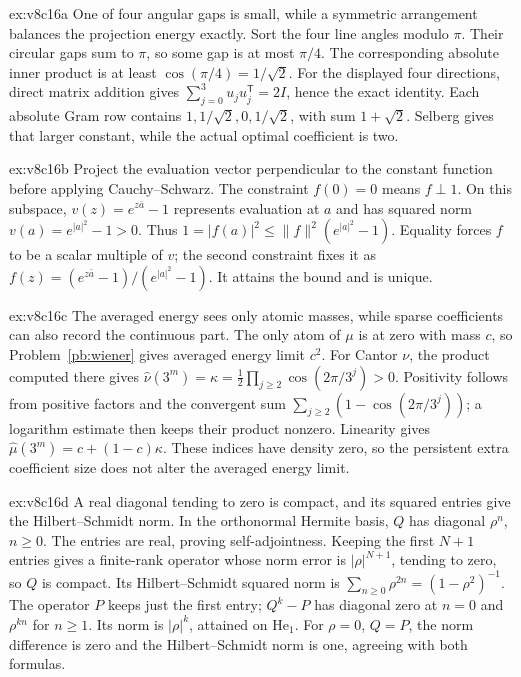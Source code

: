 \begin{solution}{ex:v8c16a}
\idea One of four angular gaps is small, while a symmetric arrangement balances the projection energy exactly.
\writeup Sort the four line angles modulo $\pi$. Their circular gaps sum to $\pi$, so some gap is at most $\pi/4$. The corresponding absolute inner product is at least $\cos(\pi/4)=1/\sqrt2$. For the displayed four directions, direct matrix addition gives $\sum_{j=0}^3u_ju_j^{\mathsf T}=2I$, hence the exact identity. Each absolute Gram row contains $1,1/\sqrt2,0,1/\sqrt2$, with sum $1+\sqrt2$. Selberg gives that larger constant, while the actual optimal coefficient is two.
\end{solution}
\begin{solution}{ex:v8c16b}
\idea Project the evaluation vector perpendicular to the constant function before applying Cauchy--Schwarz.
\writeup The constraint $f(0)=0$ means $f\perp1$. On this subspace, $v(z)=e^{z\bar a}-1$ represents evaluation at $a$ and has squared norm $v(a)=e^{|a|^2}-1>0$. Thus $1=|f(a)|^2\le\|f\|^2(e^{|a|^2}-1)$. Equality forces $f$ to be a scalar multiple of $v$; the second constraint fixes it as $f(z)=(e^{z\bar a}-1)/(e^{|a|^2}-1)$. It attains the bound and is unique.
\end{solution}
\begin{solution}{ex:v8c16c}
\idea The averaged energy sees only atomic masses, while sparse coefficients can also record the continuous part.
\writeup The only atom of $\mu$ is at zero with mass $c$, so Problem~\ref{pb:wiener} gives averaged energy limit $c^2$. For Cantor $\nu$, the product computed there gives $\hat\nu(3^m)=\kappa=\tfrac12\prod_{j\ge2}\cos(2\pi/3^j)>0$. Positivity follows from positive factors and the convergent sum $\sum_{j\ge2}(1-\cos(2\pi/3^j))$; a logarithm estimate then keeps their product nonzero. Linearity gives $\hat\mu(3^m)=c+(1-c)\kappa$. These indices have density zero, so the persistent extra coefficient size does not alter the averaged energy limit.
\end{solution}
\begin{solution}{ex:v8c16d}
\idea A real diagonal tending to zero is compact, and its squared entries give the Hilbert--Schmidt norm.
\writeup In the orthonormal Hermite basis, $Q$ has diagonal $\rho^n$, $n\ge0$. The entries are real, proving self-adjointness. Keeping the first $N+1$ entries gives a finite-rank operator whose norm error is $|\rho|^{N+1}$, tending to zero, so $Q$ is compact. Its Hilbert--Schmidt squared norm is $\sum_{n\ge0}\rho^{2n}=(1-\rho^2)^{-1}$. The operator $P$ keeps just the first entry; $Q^k-P$ has diagonal zero at $n=0$ and $\rho^{kn}$ for $n\ge1$. Its norm is $|\rho|^k$, attained on $\mathrm{He}_1$. For $\rho=0$, $Q=P$, the norm difference is zero and the Hilbert--Schmidt norm is one, agreeing with both formulas.
\end{solution}
